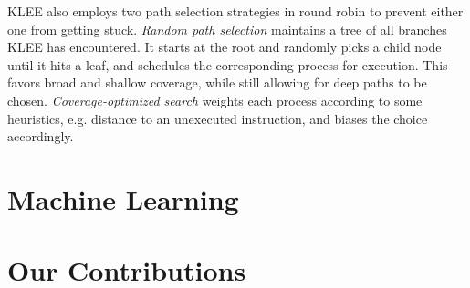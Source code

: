 %
KLEE also employs two path selection strategies in round robin to
prevent either one from getting stuck.
%
\emph{Random path selection} maintains a tree of all branches KLEE has
encountered.
%
It starts at the root and randomly picks a child node until it hits a
leaf, and schedules the corresponding process for execution.
%
This favors broad and shallow coverage, while still allowing for deep
paths to be chosen.
%
\emph{Coverage-optimized search} weights each process according to some
heuristics, e.g. distance to an unexecuted instruction, and biases the
choice accordingly.
%


\section{Machine Learning}
\label{sec:machine-learning}


\section{Our Contributions}
\label{sec:our-contributions}

